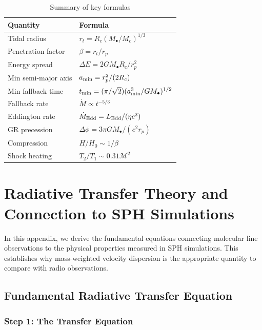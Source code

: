 \documentclass[twocolumn,amsmath,amssymb,prd,superscriptaddress,nofootinbib]{revtex4-2}
\begin{document}
\begin{table}[h]
\centering
\caption{Summary of key formulas}
\begin{tabular}{ll}
\toprule
Quantity & Formula \\
\midrule
Tidal radius & $r_t = R_c(M_\bullet/M_c)^{1/3}$ \\
Penetration factor & $\beta = r_t/r_p$ \\
Energy spread & $\Delta E = 2GM_\bullet R_c/r_p^2$ \\
Min semi-major axis & $a_{\rm min} = r_p^2/(2R_c)$ \\
Min fallback time & $t_{\rm min} = (\pi/\sqrt{2})(a_{\rm min}^3/GM_\bullet)^{1/2}$ \\
Fallback rate & $\dot{M} \propto t^{-5/3}$ \\
Eddington rate & $\dot{M}_{\rm Edd} = L_{\rm Edd}/(\eta c^2)$ \\
GR precession & $\Delta\phi = 3\pi GM_\bullet/(c^2 r_p)$ \\
Compression & $H/H_0 \sim 1/\beta$ \\
Shock heating & $T_2/T_1 \sim 0.31\mathcal{M}^2$ \\
\bottomrule
\end{tabular}
\end{table}

\section{Radiative Transfer Theory and Connection to SPH Simulations}
\label{app:radiative_transfer}

In this appendix, we derive the fundamental equations connecting molecular line observations to the physical properties measured in SPH simulations. This establishes why mass-weighted velocity dispersion is the appropriate quantity to compare with radio observations.

\subsection{Fundamental Radiative Transfer Equation}

\subsubsection{Step 1: The Transfer Equation}
\end{document}
